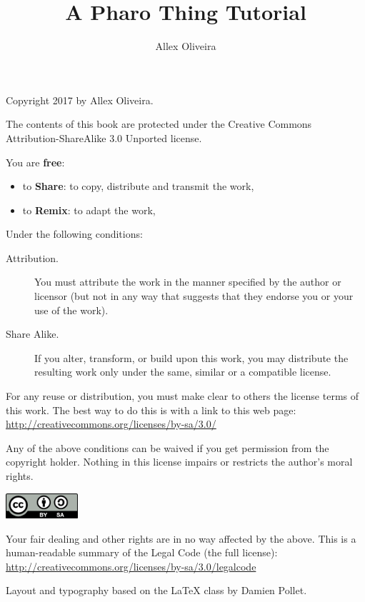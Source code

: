 \documentclass[10pt,twoside,english]{_support/latex/sbabook/sbabook}
\title{A Pharo Thing Tutorial}
\author{Allex Oliveira}
\begin{document}
\maketitle
\pagestyle{titlingpage}
\thispagestyle{titlingpage} %

\cleartoverso
{\small

  Copyright 2017 by Allex Oliveira.

  The contents of this book are protected under the Creative Commons
  Attribution-ShareAlike 3.0 Unported license.

  You are \textbf{free}:
  \begin{itemize}
  \item to \textbf{Share}: to copy, distribute and transmit the work,
  \item to \textbf{Remix}: to adapt the work,
  \end{itemize}

  Under the following conditions:
  \begin{description}
  \item[Attribution.] You must attribute the work in the manner specified by the
    author or licensor (but not in any way that suggests that they endorse you
    or your use of the work).
  \item[Share Alike.] If you alter, transform, or build upon this work, you may
    distribute the resulting work only under the same, similar or a compatible
    license.
  \end{description}

  For any reuse or distribution, you must make clear to others the
  license terms of this work. The best way to do this is with a link to
  this web page: \\
  \url{http://creativecommons.org/licenses/by-sa/3.0/}

  Any of the above conditions can be waived if you get permission from
  the copyright holder. Nothing in this license impairs or restricts the
  author's moral rights.

  \begin{center}
    \includegraphics[width=0.2\textwidth]{_support/latex/sbabook/CreativeCommons-BY-SA.pdf}
  \end{center}

  Your fair dealing and other rights are in no way affected by the
  above. This is a human-readable summary of the Legal Code (the full
  license): \\
  \url{http://creativecommons.org/licenses/by-sa/3.0/legalcode}

  \vfill

  Layout and typography based on the  \LaTeX{} class by Damien
  Pollet.
}
\end{document}
